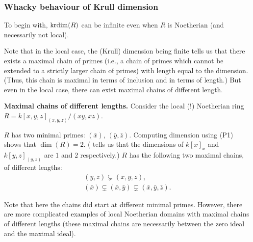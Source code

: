 \documentclass[12pt]{article}
\begin{document}
\subsubsection{Whacky behaviour of Krull dimension}

To begin with, $\operatorname{krdim}(R)$ can be infinite even when $R$ is Noetherian (and necessarily not local). 

Note that in the local case, the (Krull) dimension being finite tells us that there exists a maximal chain of primes (i.e., a chain of primes which cannot be extended to a strictly larger chain of primes) with length equal to the dimension. (Thus, this chain is maximal in terms of inclusion and in terms of length.) \newline
But even in the local case, there can exist maximal chains of different length.

\textbf{Maximal chains of different lengths.} \newline
Consider the local (!) Noetherian ring $R = k[x, y, z]_{(x, y, z)}/(xy, xz)$.

$R$ has two minimal primes: $(\bar{x})$, $(\bar{y}, \bar{z})$. Computing dimension using (P1) shows that $\dim(R) = 2$. ( tells us that the dimensions of $k[x]_{x}$ and $k[y, z]_{(y, z)}$ are $1$ and $2$ respectively.) \newline
$R$ has the following two maximal chains, of different lengths:
\begin{align*} 
	(\bar{y}, \bar{z}) \subsetneq (\bar{x}, \bar{y}, \bar{z}), \\
	(\bar{x}) \subsetneq (\bar{x}, \bar{y}) \subsetneq (\bar{x}, \bar{y}, \bar{z}).
\end{align*}

Note that here the chains did start at different minimal primes. However, there are more complicated examples of local Noetherian domains with maximal chains of different lengths (these maximal chains are necessarily between the zero ideal and the maximal ideal).
\end{document}
